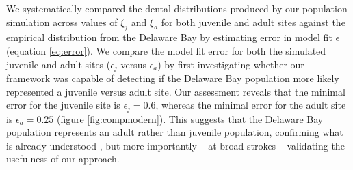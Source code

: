 \documentclass[]{rsos}%
\begin{document}
We systematically compared the dental distributions produced by our population simulation across values of $\xi_j$ and $\xi_a$ for both juvenile and adult sites against the empirical distribution from the Delaware Bay by estimating error in model fit $\epsilon$ (equation \ref{eq:error}).
We compare the model fit error for both the simulated juvenile and adult sites ($\epsilon_j$ versus $\epsilon_a$) by first investigating whether our framework was capable of detecting if the Delaware Bay population more likely represented a juvenile versus adult site.
Our assessment reveals that the minimal error for the juvenile site is $\epsilon_j = 0.6$, whereas the minimal error for the adult site is $\epsilon_a = 0.25$ (figure \ref{fig:compmodern}).
This suggests that the Delaware Bay population represents an adult rather than juvenile population, confirming what is already understood \cite{haulsee2018spatial, Kneebone2012}, but more importantly -- at broad strokes -- validating the usefulness of our approach.
\end{document}
